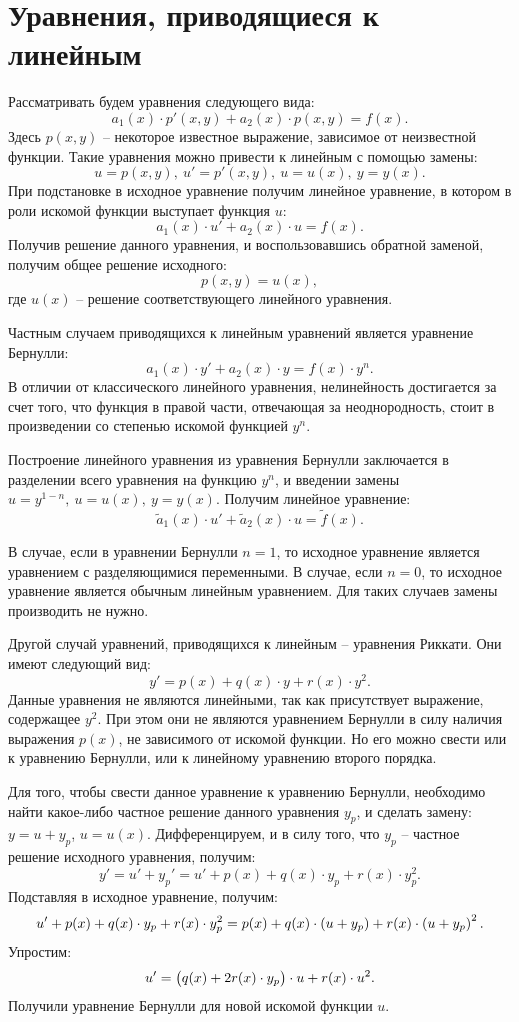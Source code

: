 \section{Уравнения, приводящиеся к линейным}

	Рассматривать будем уравнения следующего вида:
	\[ a_1(x) \cdot p'(x, y) + a_2(x) \cdot p(x, y) = f(x). \]
	Здесь $p(x, y)$ -- некоторое известное выражение, зависимое от неизвестной функции.
	Такие уравнения можно привести к линейным с помощью замены:
	\[ u = p(x, y), ~ u' = p'(x, y), ~ u = u(x), ~ y = y(x). \]
	При подстановке в исходное уравнение получим линейное уравнение, в котором в роли искомой функции выступает функция $u$:
	\[ a_1(x) \cdot u' + a_2(x) \cdot u = f(x). \] 
	Получив решение данного уравнения, и воспользовавшись обратной заменой, получим общее решение исходного:
	\[ p(x, y) = u(x), \]
	где $u(x)$ -- решение соответствующего линейного уравнения.

	Частным случаем приводящихся к линейным уравнений является уравнение Бернулли:
	\[ a_1(x) \cdot y' + a_2(x) \cdot y = f(x) \cdot y^{n}. \]
	В отличии от классического линейного уравнения, нелинейность достигается за счет того, что функция в правой части, отвечающая за неоднородность, стоит в произведении со степенью искомой функцией $y^n$.

	Построение линейного уравнения из уравнения Бернулли заключается в разделении всего уравнения на функцию $y^n$, и введении замены $u = y^{1-n}, ~ u = u(x), ~ y = y(x)$. Получим линейное уравнение:
	\[ \tilde{a}_1(x) \cdot u' + \tilde{a}_2(x) \cdot u = \tilde{f}(x). \]

	В случае, если в уравнении Бернулли $n = 1$, то исходное уравнение является уравнением с разделяющимися переменными. В случае, если $n = 0$, то исходное уравнение является обычным линейным уравнением. Для таких случаев замены производить не нужно.

	Другой случай уравнений, приводящихся к линейным -- уравнения Риккати. Они имеют следующий вид:
	\[ y' = p(x) + q(x) \cdot y + r(x) \cdot y^2. \]
	Данные уравнения не являются линейными, так как присутствует выражение, содержащее $y^2$. При этом они не являются уравнением Бернулли в силу наличия выражения $p(x)$, не зависимого от искомой функции. Но его можно свести или к уравнению Бернулли, или к линейному уравнению второго порядка.

	Для того, чтобы свести данное уравнение к уравнению Бернулли, необходимо найти какое-либо частное решение данного уравнения $y_p$, и сделать замену: $y = u + y_p$, $u = u(x)$.
	Дифференцируем, и в силу того, что $y_p$ -- частное решение исходного уравнения, получим:
	\[ y' = u' + y_p' = u' + p(x) + q(x) \cdot y_p + r(x) \cdot y_p^2. \]
	Подставляя в исходное уравнение, получим:
	\[ u' + p(x) + q(x) \cdot y_p + r(x) \cdot y_p^2 = p(x) + q(x) \cdot \left( u + y_p \right) + r(x) \cdot \left( u + y_p \right)^2. \]
	Упростим:
	\[ u' = \bigl( q(x) + 2r(x) \cdot y_p \bigr) \cdot u + r(x) \cdot u^2. \]
	Получили уравнение Бернулли для новой искомой функции $u$.

